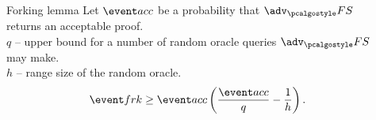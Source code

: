 \documentclass[aspectratio=169,handout]{beamer}
\newcommand{\advfs}{\adv_\fs}
\renewcommand{\myskip}{0.5\baselineskip}
\begin{document}
\begin{frame}
\begin{columns}
\begin{column}{0.5\linewidth}
\end{column}
\begin{column}{0.5\linewidth}
  \begin{block}{Forking lemma}
    Let $\accProb$ be a probability that $\advfs$ returns an acceptable proof.\\
    $q$ -- upper bound for a number of random oracle queries $\advfs$ may
    make.\\
    $h$ -- range size of the random oracle.
    \[
      \frkProb \geq \accProb \left(\frac{\accProb}{q} - \frac{1}{h}\right).
    \]
  \end{block}
\end{column}
\end{columns}
\vspace*{0.5cm}
\centering{}
\end{frame}
\end{document}

